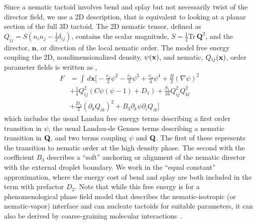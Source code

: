\documentclass[%
 aip,
 amsmath,amssymb,
 reprint,%
]{revtex4-1}
\begin{document}
Since a nematic tactoid involves bend and splay but not necessarily twist of the director field, we use a 2D description, that is equivalent to looking at a planar section of the full 3D tactoid. The 2D nematic tensor, defined as $ Q_{ij} = S(n_{i} n_{j} -\frac{1}{2} \delta_{ij})$, contains the scalar magnitude, $S= \frac{1}{2}$Tr$\,\mathbf{Q}^2$, and the director, $\mathbf{n}$, or direction of the local nematic order. The model free energy coupling the 2D, nondimensionalized density, $\psi({\bf x})$, and nematic, $Q_{ij}({\bf x})$, order parameter fields is written as \cite{Lowen11},
\begin{equation}
\begin{split}
F &= \int \, d \mathbf{x}  \bigg[ -\frac{v_{2}}{2} \psi^{2} -  \frac{v_{3}}{3} \psi^{3} +  \frac{v_{4}}{4} \psi^{4}  + \frac{B}{2} (\nabla \psi)^{2}  \\
& + \frac{1}{4} Q_{ij}^{2} (C \psi (\psi - 1) + D_{1}) 
+ \frac{S_{1}}{16} Q_{ij}^{2} Q_{kl}^{2} \\
& + \frac{D_{2}}{2} (\partial_{k} Q_{ik})^{2} + B_{3} \partial_{k} \psi \partial_{i} Q_{ik} \bigg]
\label{free_energy}
\end{split}
\end{equation}
which includes the usual Landau free energy terms describing a first order transition in $\psi$, the usual Landau-de Gennes terms describing a nematic transition in ${\bf Q}$, and two terms coupling $\psi$ and ${\bf Q}$. The first of these represents the transition to nematic order at the high density phase. The second with the coefficient $B_{3}$ describes a ``soft'' anchoring or alignment of the nematic director with the external droplet boundary. We work in the ``equal constant'' approximation, where the energy cost of bend and splay are both included in the term with prefactor $D_2$. Note that while this free energy is for a phenomenological phase field model that describes the nematic-isotropic (or nematic-vapor) interface and can nucleate tactoids for suitable parameters, it can also be derived by coarse-graining molecular interactions~\cite{Lowen10,Lowen11}.

\end{document}
